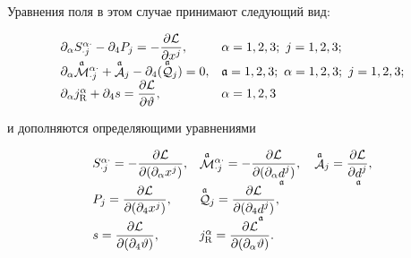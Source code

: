 Уравнения поля в этом случае принимают следующий вид:

\begin{equation}

\begin{array}{ll}

\partial_\alpha S_{\cdot j}^{\alpha\cdot}-\partial_4 P_j=-\displaystyle\frac{\partial{\mathcal L}}{\partial x^j},

&\alpha=1, 2, 3;\,\, j=1, 2, 3; \\

\partial_\alpha {\mathop {\mathcal M}\limits^{\mathfrak a}}{}_{\cdot j}^{\alpha\cdot}+{\mathop {\mathcal A}\limits^{\mathfrak a}}{}_j-\partial_4({\mathop {\mathcal Q}\limits^{\mathfrak a}}{}_j)=0,

&{\mathfrak a}=1, 2, 3;\,\, \alpha=1, 2, 3;\,\, j=1, 2, 3;\\

\partial_\alpha j^\alpha_{\rm R}+\partial_4 s =\displaystyle\frac{\partial{\mathcal L}}{\partial\vartheta}, & \alpha=1, 2, 3\\

\end{array}

\end{equation}

и дополняются определяющими уравнениями

\begin{equation}

\begin{array}{ll}

S_{\cdot j}^{\alpha\cdot}=-\displaystyle\frac{\partial{\mathcal L}}{\partial(\partial_\alpha x^j)},&

{\mathop {\mathcal M}\limits^{\mathfrak a}}{}_{\cdot j}^{\alpha\cdot}=-\displaystyle\frac{\partial{\mathcal L}}{\partial(\partial_\alpha {\mathop d\limits_{\mathfrak a}}^j)},\quad

{\mathop {\mathcal A}\limits^{\mathfrak a}}{}_j=\displaystyle\frac{\partial{\mathcal L}}{\partial{\mathop d\limits_{\mathfrak a}}^j},\\

P_j=\displaystyle\frac{\partial{\mathcal L}}{\partial (\partial_4 x^j)},&

{\mathop {\mathcal Q}\limits^{\mathfrak a}}{}_j=\displaystyle\frac{\partial{\mathcal L}}{\partial(\partial_4{\mathop d\limits_{\mathfrak a}}^j)},\\

s=\displaystyle\frac{\partial{\mathcal L}}{\partial(\partial_4 \vartheta)},& j^\alpha_{\rm R}=\displaystyle\frac{\partial{\mathcal L}}{\partial(\partial_\alpha\vartheta)}.\\

\end{array}

\end{equation}



